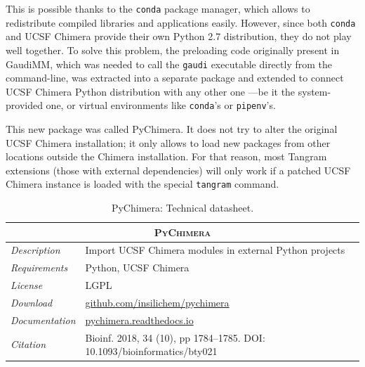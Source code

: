 This is possible thanks to the \texttt{conda} package manager,\cite{conda} which allows to redistribute compiled libraries and applications easily. However, since both \texttt{conda} and UCSF Chimera provide their own Python 2.7 distribution, they do not play well together. To solve this problem, the preloading code originally present in GaudiMM, which was needed to call the \texttt{gaudi} executable directly from the command-line, was extracted into a separate package and extended to connect UCSF Chimera Python distribution with any other one –--be it the system-provided one, or virtual environments like \texttt{conda}'s or \texttt{pipenv}'s.

This new package was called PyChimera.\cite{pychimera} It does not try to alter the original UCSF Chimera installation; it only allows to load new packages from other locations outside the Chimera installation. For that reason, most Tangram extensions (those with external dependencies) will only work if a patched UCSF Chimera instance is loaded with the special \texttt{tangram} command.

\begin{table}[hbtp]
	\caption[PyChimera: Technical datasheet]{PyChimera: Technical datasheet.}
	\footnotesize
	\newcommand{\tableheading}[1]{\multicolumn{2}{c}{\textsc{#1}}}
	\begin{tabularx}{\textwidth}{RL}
		\toprule
		\tableheading{PyChimera}\\
		\toprule
		\textit{Description} & Import UCSF Chimera modules in external Python projects \\
		\midrule
		\textit{Requirements} & Python, UCSF Chimera \\
		\midrule
		\textit{License} & LGPL \\
		\midrule
		\textit{Download} & \href{https://github.com/insilichem/pychimera}{github.com/insilichem/pychimera} \\
		\midrule
		\textit{Documentation} & \href{http://pychimera.readthedocs.io}{pychimera.readthedocs.io} \\
		\midrule
		\textit{Citation} & Bioinf. 2018, 34 (10), pp 1784–1785. DOI: 10.1093/bioinformatics/bty021\cite{pychimera} \\
		\bottomrule

	\end{tabularx}
\end{table}

